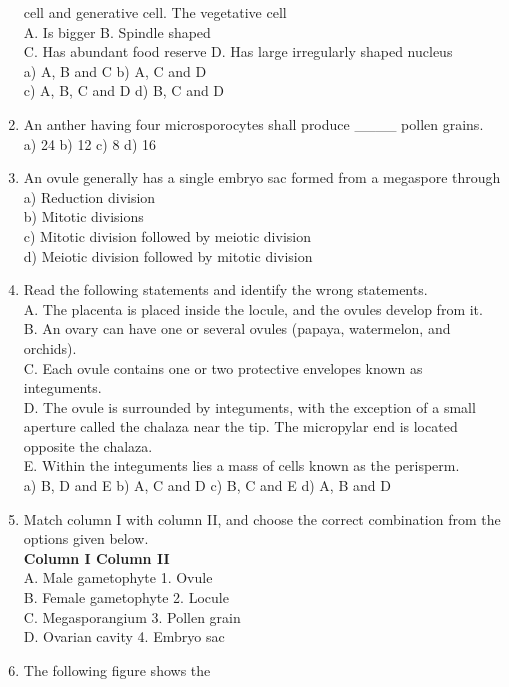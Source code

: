 \begin{enumerate}
  cell and generative cell. The vegetative cell\\
  A. Is bigger B. Spindle shaped\\
  C. Has abundant food reserve D. Has large irregularly shaped nucleus\\
  a) A, B and C b) A, C and D\\
  c) A, B, C and D d) B, C and D
\item
  An anther having four microsporocytes shall produce \_\_\_\_ pollen
  grains.\\
  a) 24 b) 12 c) 8 d) 16
\item
  An ovule generally has a single embryo sac formed from a megaspore
  through\\
  a) Reduction division\\
  b) Mitotic divisions\\
  c) Mitotic division followed by meiotic division\\
  d) Meiotic division followed by mitotic division
\item
  Read the following statements and identify the wrong statements.\\
  A. The placenta is placed inside the locule, and the ovules develop
  from it.\\
  B. An ovary can have one or several ovules (papaya, watermelon, and
  orchids).\\
  C. Each ovule contains one or two protective envelopes known as
  integuments.\\
  D. The ovule is surrounded by integuments, with the exception of a
  small aperture called the chalaza near the tip. The micropylar end is
  located opposite the chalaza.\\
  E. Within the integuments lies a mass of cells known as the
  perisperm.\\
  a) B, D and E b) A, C and D c) B, C and E d) A, B and D
\item
  Match column I with column II, and choose the correct combination from
  the options given below.\\
  \textbf{Column I Column II\\
  }A. Male gametophyte 1. Ovule\\
  B. Female gametophyte 2. Locule\\
  C. Megasporangium 3. Pollen grain\\
  D. Ovarian cavity 4. Embryo sac
\item
  The following figure shows the\\
  \strut \\

\end{enumerate}

